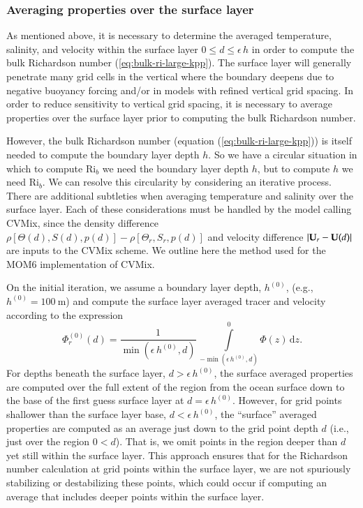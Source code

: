 \subsubsection{Averaging properties over the surface layer}

As mentioned above, it is necessary to determine the averaged
temperature, salinity, and velocity within the surface layer $0 \le d
\le \epsilon \, h$ in order to compute the bulk Richardson number
(\ref{eq:bulk-ri-large-kpp}).  The surface layer will generally
penetrate many grid cells in the vertical where the boundary deepens
due to negative buoyancy forcing and/or in models with refined
vertical grid spacing.  In order to reduce sensitivity to vertical
grid spacing, it is necessary to average properties over the surface
layer prior to computing the bulk Richardson number.

However, the bulk Richardson number (equation
(\ref{eq:bulk-ri-large-kpp})) is itself needed to compute the boundary
layer depth $h$.  So we have a circular situation in which to compute
$\mbox{Ri}_{b}$ we need the boundary layer depth $h$, but to compute
$h$ we need $\mbox{Ri}_{b}$.  We can resolve this circularity by
considering an iterative process.  There are additional subtleties
when averaging temperature and salinity over the surface layer.  Each
of these considerations must be handled by the model calling CVMix,
since the density difference $\rho[\Theta(d), S(d), p(d)] -
\rho[\Theta_{r}, S_{r}, p(d)]$ and velocity difference $|{\bf U}_{r} -
{\bf U}(d)|$ are inputs to the CVMix scheme.  We outline here the
method used for the MOM6 implementation of CVMix.

On the initial iteration, we assume a boundary layer depth, $h^{(0)}$,
(e.g., $h^{(0)} = 100~\mbox{m}$) and compute the surface layer
averaged tracer and velocity according to the expression
\begin{equation}
   \Phi^{(0)}_{r}(d) = \frac{1}{\min(\epsilon \, h^{(0)}, d)} \, \int\limits^{0}_{-\min(\epsilon \, h^{(0)}, d)} \Phi(z) \, \mathrm{d}z.
\label{eq:surface-averaging}
\end{equation}
For depths beneath the surface layer, $d > \epsilon \, h^{(0)}$, the
surface averaged properties are computed over the full extent of the
region from the ocean surface down to the base of the first guess
surface layer at $d= \epsilon \, h^{(0)}$. However, for grid points
shallower than the surface layer base, $d < \epsilon \, h^{(0)}$, the
``surface'' averaged properties are computed as an average just down
to the grid point depth $d$ (i.e., just over the region $0 < d$).
That is, we omit points in the region deeper than $d$ yet still within
the surface layer.  This approach ensures that for the Richardson
number calculation at grid points within the surface layer, we are not
spuriously stabilizing or destabilizing these points, which could
occur if computing an average that includes deeper points within the
surface layer.

